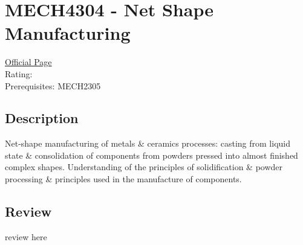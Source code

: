 \hypertarget{MECH4304}{\section{MECH4304 - Net Shape Manufacturing}}

\large
\textcolor{turbo_purple}{\href{https://my.uq.edu.au/programs-courses/course.html?course_code=MECH4304}{Official Page}} \\
Rating: \cstar\cstar\cstar\cstar\ostar \\
Prerequisites: MECH2305

\normalsize
\subsection*{Description}
Net-shape manufacturing of metals \& ceramics processes: casting from liquid state \& consolidation of components from powders pressed into almost finished complex shapes.
Understanding of the principles of solidification \& powder processing \& principles used in the manufacture of components.

\subsection*{Review}
review here
